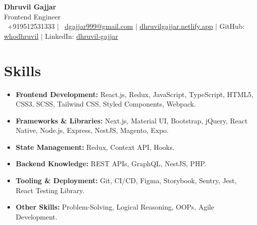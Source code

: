 \documentclass[letterpaper,10pt]{article}
\begin{document}
\RaggedRight

\begin{center}
    \textbf{\Huge Dhruvil Gajjar} \\
    \vspace{0.1em}
    \Large Frontend Engineer \\
    \vspace{0.2em}
    \small \Telefon~+919512531333 $|$ \Letter~\href{mailto:dgajjar999@gmail.com}{dgajjar999@gmail.com} $|$ \href{https://dhruvilgajjar.netlify.app}{dhruvilgajjar.netlify.app} $|$ GitHub: \href{https://github.com/whodhruvil}{whodhruvil} $|$ LinkedIn: \href{https://www.linkedin.com/in/dhruvil-gajjar}{dhruvil-gajjar}
\end{center}

\section*{Skills}
\begin{itemize}
    \item \textbf{Frontend Development:} React.js, Redux, JavaScript, TypeScript, HTML5, CSS3, SCSS, Tailwind CSS, Styled Components, Webpack.
    \item \textbf{Frameworks \& Libraries:} Next.js, Material UI, Bootstrap, jQuery, React Native, Node.js, Express, NestJS, Magento, Expo.
    \item \textbf{State Management:} Redux, Context API, Hooks.
    \item \textbf{Backend Knowledge:} REST APIs, GraphQL, NestJS, PHP.
    \item \textbf{Tooling \& Deployment:} Git, CI/CD, Figma, Storybook, Sentry, Jest, React Testing Library.
    \item \textbf{Other Skills:} Problem-Solving, Logical Reasoning, OOPs, Agile Development.
\end{itemize}
\end{document}
